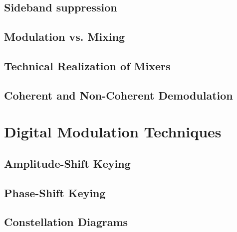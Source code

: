 \begin{refsection}



\subsection{Sideband suppression}


\subsection{Modulation vs. Mixing}

\subsection{Technical Realization of Mixers}



\subsection{Coherent and Non-Coherent Demodulation}

\section{Digital Modulation Techniques}

\subsection{Amplitude-Shift Keying}

\subsection{Phase-Shift Keying}

\subsection{Constellation Diagrams}




\end{refsection}

